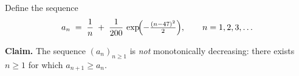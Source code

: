 \begin{problem}
Define the sequence
\[
  a_{n} \;=\; \frac{1}{n} \;+\; \frac{1}{200}\,
  \exp\!\Bigl(-\tfrac{(n - 47)^{2}}{2}\Bigr),
  \qquad n = 1, 2, 3, \dots
\]

\textbf{Claim.} The sequence $(a_{n})_{n \geq 1}$ is \emph{not}
monotonically decreasing: there exists $n \geq 1$ for which
$a_{n+1} \geq a_{n}$.
\end{problem}
